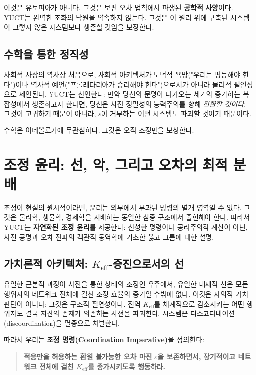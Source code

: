 \documentclass[12pt,a4paper]{article}
\begin{document}
	이것은 유토피아가 아니다. 그것은 보편 오차 법칙에서 파생된 \textbf{공학적 사양}이다. YUCT는 완벽한 조화의 낙원을 약속하지 않는다. 그것은 이 원리 위에 구축된 시스템이 그렇지 않은 시스템보다 생존할 것임을 보장한다.
	
	\subsection{수학을 통한 정직성}
	
	사회적 사상의 역사상 처음으로, 사회적 아키텍처가 도덕적 욕망("우리는 평등해야 한다")이나 역사적 예언("프롤레타리아가 승리해야 한다")으로서가 아니라 물리적 필연성으로 제안된다. YUCT는 선언한다: 만약 당신의 문명이 다가오는 세기의 증가하는 복잡성에서 생존하고자 한다면, 당신은 사전 정밀성의 능력주의를 향해 \emph{전환할 것이다}. 그것이 고귀하기 때문이 아니라, \(\varepsilon\)이 거부하는 어떤 시스템도 파괴할 것이기 때문이다.
	
	수학은 이데올로기에 무관심하다. 그것은 오직 조정만을 보상한다.
	
	\section{조정 윤리: 선, 악, 그리고 오차의 최적 분배}
	\label{sec:coordination-ethics}
	
	조정이 현실의 원시적이라면, 윤리는 외부에서 부과된 명령의 별개 영역일 수 없다. 그것은 물리학, 생물학, 경제학을 지배하는 동일한 삼중 구조에서 출현해야 한다. 따라서 YUCT는 \textbf{자연화된 조정 윤리}를 제공한다: 신성한 명령이나 공리주의적 계산이 아닌, 사전 공명과 오차 전파의 객관적 동역학에 기초한 옳고 그름에 대한 설명.
	
	\subsection{가치론적 아키텍처: \(K_{\mathrm{eff}}\)-증진으로서의 선}
	
	유일한 근본적 과정이 사전을 통한 상태의 조정인 우주에서, 유일한 내재적 선은 모든 행위자의 네트워크 전체에 걸친 조정 효율의 증가일 수밖에 없다. 이것은 자의적 가치 판단이 아니다; 그것은 구조적 필연성이다. 전역 \(K_{\mathrm{eff}}\)를 체계적으로 감소시키는 어떤 행위자도 결국 자신의 존재가 의존하는 사전을 파괴한다. 시스템은 디스코디네이션(discoordination)을 멸종으로 처벌한다.
	
	따라서 우리는 \textbf{조정 명령(Coordination Imperative)}을 정의한다:
	
	\begin{quote}
		\textbf{적응만을 허용하는 환원 불가능한 오차 마진 \(\varepsilon\)을 보존하면서, 장기적이고 네트워크 전체에 걸친 $K_{\mathrm{eff}}$를 증가시키도록 행동하라.}
	\end{quote}
	
\end{document}

